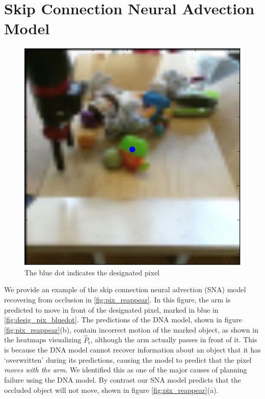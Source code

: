 \section{Skip Connection Neural Advection Model}
\label{sec:skipcon}
\begin{figure}
	\centering
	\includegraphics[width=0.37\columnwidth]{images_sna/occlusionaware/img_desigpixb0.png}
	\caption{The blue dot indicates the designated pixel}
	\label{fig:desig_pix_bluedot}
\end{figure}

We provide an example of the skip connection neural advection (SNA) model recovering from occlusion in \autoref{fig:pix_reappear}. In this figure, the arm is predicted to move in front of the designated pixel, marked in blue in \autoref{fig:desig_pix_bluedot}. The predictions of the DNA model, shown in figure \autoref{fig:pix_reappear}(b), contain incorrect motion of the marked object, as shown in the heatmaps visualizing $\hat{P}_t$, although the arm actually passes in front of it. This is because the DNA model cannot recover information about an object that it has `overwritten' during its predictions, causing the model to predict that the pixel \emph{moves with the arm}. We identified this as one of the major causes of planning failure using the DNA model. By contrast our SNA model predicts that the occluded object will not move, shown in figure  \autoref{fig:pix_reappear}(a).

